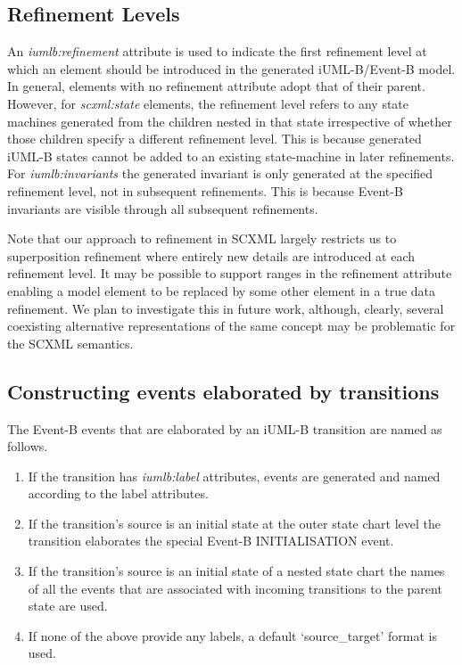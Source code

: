 \subsection{Refinement Levels}
An \emph{iumlb:refinement} attribute is used to indicate the first refinement 
level at which an element should be introduced in the generated iUML-B/Event-B model. 
In general, elements with no refinement attribute adopt that of their parent.  
However, for \emph{scxml:state} elements, the refinement level refers to any state 
machines generated from the children nested in that state irrespective of whether 
those children specify a different refinement level. This is because generated 
iUML-B states cannot be added to an existing state-machine in later refinements.
For \emph{iumlb:invariants} the generated invariant is only  generated at the 
specified refinement level, not in  subsequent refinements. This is because Event-B 
invariants are visible through all subsequent refinements.

Note that our approach to refinement in SCXML largely restricts us to superposition 
refinement where entirely new details are introduced at each refinement level.  
It may be possible to support ranges in the refinement attribute enabling a model 
element to be replaced by some other element in a true data refinement. We plan to 
investigate this in future work, although, clearly, several coexisting alternative 
representations of the same concept may be problematic for the SCXML semantics.

\subsection{Constructing events elaborated by transitions}
The Event-B events that are elaborated by an iUML-B  transition are named as follows. 

\begin{enumerate}
\item If the transition has \emph{iumlb:label} attributes, events are generated 
and named according to the label attributes.
\item If the transition's source is an initial state at the outer state chart 
level the transition elaborates the special Event-B INITIALISATION event. 
\item If the transition's source is an initial state of a nested state chart 
the names of all the events that are associated with incoming transitions to 
the parent state are used.
\item If none of the above provide any labels, a default  `source\_target' format is used.
\end{enumerate}

